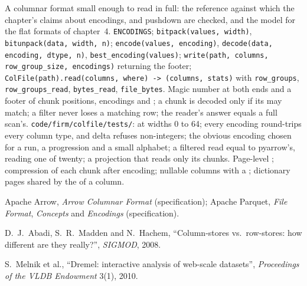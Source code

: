 \begin{build}
 A columnar format small enough to read in full: the reference against which the chapter's claims about
encodings,  and pushdown are checked, and the model for the flat formats of chapter~4.
 \texttt{ENCODINGS}; \texttt{bitpack(values, width)}, \texttt{bitunpack(data, width, n)};
\texttt{encode(values, encoding)}, \texttt{decode(data, encoding, dtype, n)}, \texttt{best\_encoding(values)};
\texttt{write(path, columns, row\_group\_size, encodings)} returning the footer; \texttt{ColFile(path).read(columns, where) ->
(columns, stats)} with \texttt{row\_groups}, \texttt{row\_groups\_read}, \texttt{bytes\_read}, \texttt{file\_bytes}.
 Magic number at both ends and a footer of chunk positions, encodings and ; a chunk is decoded only if its
 may match; a filter never loses a matching row; the reader's answer equals a full scan's.
 \texttt{code/firm/colfile/tests/}:  at widths 0 to 64; every encoding round-trips every column
type, and delta refuses non-integers; the obvious encoding chosen for a run, a progression and a small alphabet; a filtered read
equal to pyarrow's, reading one  of twenty; a projection that reads only its chunks.
 Page-level ; compression of each chunk after encoding; nullable columns with a ;
dictionary pages shared by the  of a column.
\end{build}

\begin{omsources}
\item Apache Arrow, \emph{Arrow Columnar Format} (specification); Apache Parquet, \emph{File Format}, \emph{Concepts} and
\emph{Encodings} (specification).
\item D.~J.~Abadi, S.~R.~Madden and N.~Hachem, ``Column-stores vs.\ row-stores: how different are they really?'',
\emph{SIGMOD}, 2008.
\item S.~Melnik et al., ``Dremel: interactive analysis of web-scale datasets'', \emph{Proceedings of the VLDB Endowment} 3(1),
2010.
\end{omsources}

